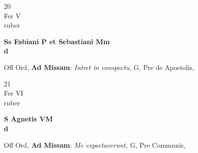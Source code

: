 \documentclass[10pt, openany]{book}
\begin{document}
        \begin{center}
            \begin{minipage}{3.5in}
                \vspace{2em}
                \begin{minipage}{0.5in}
                    {\Huge 20} \\
                    {\normalsize Fer V} \\
                    {\normalsize ruber}
                \end{minipage}
                \begin{minipage}{3.0in}
                    \textbf{ \large Ss Fabiani P et Sebastiani Mm \\
                    \textnormal{\normalsize d}} \\ 
                \end{minipage}
                \begin{justify}Off Ord, \textbf{Ad Missam}: \textit{Intret in conspectu,} G, Pre de Apostolis,   
                \end{justify}
            \end{minipage}
        \end{center}
    
        \begin{center}
            \begin{minipage}{3.5in}
                \vspace{2em}
                \begin{minipage}{0.5in}
                    {\Huge 21} \\
                    {\normalsize Fer VI} \\
                    {\normalsize ruber}
                \end{minipage}
                \begin{minipage}{3.0in}
                    \textbf{ \large S Agnetis VM \\
                    \textnormal{\normalsize d}} \\ 
                \end{minipage}
                \begin{justify}Off Ord, \textbf{Ad Missam}: \textit{Me expectaverunt,} G, Pre Communis,   
                \end{justify}
            \end{minipage}
        \end{center}
    
\end{document}
